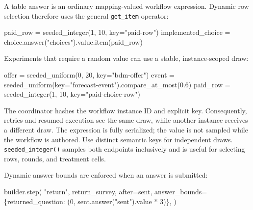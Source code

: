 \documentclass[
  10pt,
]{report}
\newenvironment{Shaded}{}{}
\newcommand{\DecValTok}[1]{\textcolor[rgb]{0.25,0.63,0.44}{#1}}
\newcommand{\FloatTok}[1]{\textcolor[rgb]{0.25,0.63,0.44}{#1}}
\newcommand{\NormalTok}[1]{#1}
\newcommand{\OperatorTok}[1]{\textcolor[rgb]{0.40,0.40,0.40}{#1}}
\newcommand{\StringTok}[1]{\textcolor[rgb]{0.25,0.44,0.63}{#1}}
\begin{document}
A table answer is an ordinary mapping-valued workflow expression.
Dynamic row selection therefore uses the general \texttt{get\_item}
operator:

\begin{Shaded}
\begin{Highlighting}[]
\NormalTok{paid\_row }\OperatorTok{=}\NormalTok{ seeded\_integer(}\DecValTok{1}\NormalTok{, }\DecValTok{10}\NormalTok{, key}\OperatorTok{=}\StringTok{"paid{-}row"}\NormalTok{)}
\NormalTok{implemented\_choice }\OperatorTok{=}\NormalTok{ choice.answer(}\StringTok{"choices"}\NormalTok{).value.item(paid\_row)}
\end{Highlighting}
\end{Shaded}

Experiments that require a random value can use a stable,
instance-scoped draw:

\begin{Shaded}
\begin{Highlighting}[]
\NormalTok{offer }\OperatorTok{=}\NormalTok{ seeded\_uniform(}\DecValTok{0}\NormalTok{, }\DecValTok{20}\NormalTok{, key}\OperatorTok{=}\StringTok{"bdm{-}offer"}\NormalTok{)}
\NormalTok{event }\OperatorTok{=}\NormalTok{ seeded\_uniform(key}\OperatorTok{=}\StringTok{"forecast{-}event"}\NormalTok{).compare\_at\_most(}\FloatTok{0.6}\NormalTok{)}
\NormalTok{paid\_row }\OperatorTok{=}\NormalTok{ seeded\_integer(}\DecValTok{1}\NormalTok{, }\DecValTok{10}\NormalTok{, key}\OperatorTok{=}\StringTok{"paid{-}choice{-}row"}\NormalTok{)}
\end{Highlighting}
\end{Shaded}

The coordinator hashes the workflow instance ID and explicit key.
Consequently, retries and resumed execution see the same draw, while
another instance receives a different draw. The expression is fully
serialized; the value is not sampled while the workflow is authored. Use
distinct semantic keys for independent draws. \texttt{seeded\_integer()}
samples both endpoints inclusively and is useful for selecting rows,
rounds, and treatment cells.

Dynamic answer bounds are enforced when an answer is submitted:

\begin{Shaded}
\begin{Highlighting}[]
\NormalTok{builder.step(}
    \StringTok{"return"}\NormalTok{,}
\NormalTok{    return\_survey,}
\NormalTok{    after}\OperatorTok{=}\NormalTok{sent,}
\NormalTok{    answer\_bounds}\OperatorTok{=}\NormalTok{\{returned\_question: (}\DecValTok{0}\NormalTok{, sent.answer(}\StringTok{"sent"}\NormalTok{).value }\OperatorTok{*} \DecValTok{3}\NormalTok{)\},}
\NormalTok{)}
\end{Highlighting}
\end{Shaded}
\end{document}

